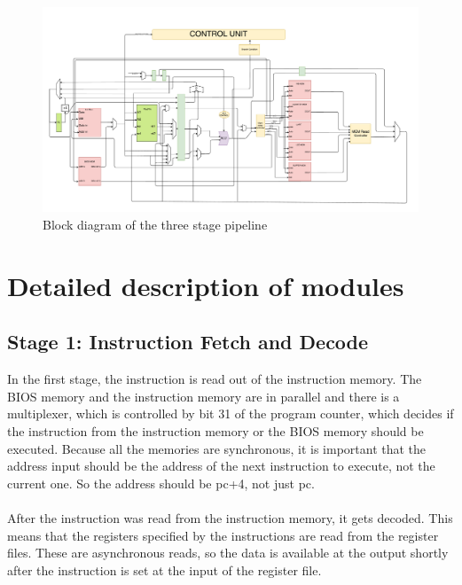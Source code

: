 \documentclass[12pt]{article}
\begin{document}
\begin{figure}[!p]
\includegraphics[scale = 0.32, angle=90]{datapath_Diagram.pdf}
\caption{Block diagram of the three stage pipeline}
\label{fig:block-diagram}
\end{figure}


\section{Detailed description of modules}
\subsection{Stage 1: Instruction Fetch and Decode}
In the first stage, the instruction is read out of the instruction memory. The BIOS memory and the instruction memory are in parallel and there is a multiplexer, which is controlled by bit 31 of the program counter, which decides if the instruction from the instruction memory or the BIOS memory should be executed. Because all the memories are synchronous, it is important that the address input should be the address of the next instruction to execute, not the current one. So the address should be pc+4, not just pc. \\\\
After the instruction was read from the instruction memory, it gets decoded. This means that the registers specified by the instructions are read from the register files. These are asynchronous reads, so the data is available at the output shortly after the instruction is set at the input of the register file.
\end{document}
